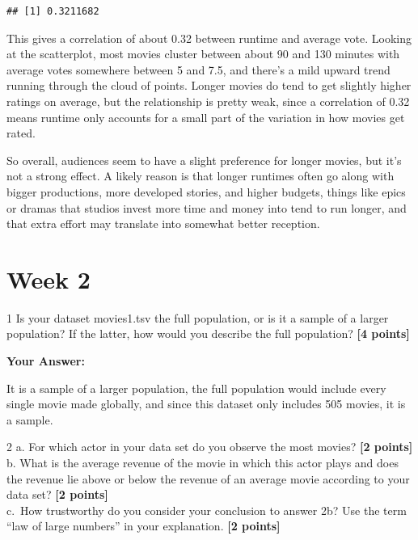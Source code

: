 \documentclass[
]{article}
\newenvironment{Shaded}{\begin{snugshade}}{\end{snugshade}}
\newcommand{\AttributeTok}[1]{\textcolor[rgb]{0.13,0.29,0.53}{#1}}
\newcommand{\FunctionTok}[1]{\textcolor[rgb]{0.13,0.29,0.53}{\textbf{#1}}}
\newcommand{\NormalTok}[1]{#1}
\newcommand{\SpecialCharTok}[1]{\textcolor[rgb]{0.81,0.36,0.00}{\textbf{#1}}}
\newcommand{\StringTok}[1]{\textcolor[rgb]{0.31,0.60,0.02}{#1}}
\begin{document}
\begin{Shaded}
\end{Shaded}

\begin{verbatim}
## [1] 0.3211682
\end{verbatim}

This gives a correlation of about 0.32 between runtime and average vote.
Looking at the scatterplot, most movies cluster between about 90 and 130
minutes with average votes somewhere between 5 and 7.5, and there's a
mild upward trend running through the cloud of points. Longer movies do
tend to get slightly higher ratings on average, but the relationship is
pretty weak, since a correlation of 0.32 means runtime only accounts for
a small part of the variation in how movies get rated.

So overall, audiences seem to have a slight preference for longer
movies, but it's not a strong effect. A likely reason is that longer
runtimes often go along with bigger productions, more developed stories,
and higher budgets, things like epics or dramas that studios invest more
time and money into tend to run longer, and that extra effort may
translate into somewhat better reception.

\section{Week 2}\label{week-2}

1 Is your dataset movies1.tsv the full population, or is it a sample of
a larger population? If the latter, how would you describe the full
population? \textbf{[4 points]}

\textbf{Your Answer:}

It is a sample of a larger population, the full population would include
every single movie made globally, and since this dataset only includes
505 movies, it is a sample.

2 a. For which actor in your data set do you observe the most movies?
\textbf{[2 points]} b. What is the average revenue of the movie in which
this actor plays and does the revenue lie above or below the revenue of
an average movie according to your data set? \textbf{[2 points]}\\
c.~How trustworthy do you consider your conclusion to answer 2b? Use the
term ``law of large numbers'' in your explanation. \textbf{[2 points]}
\end{document}
